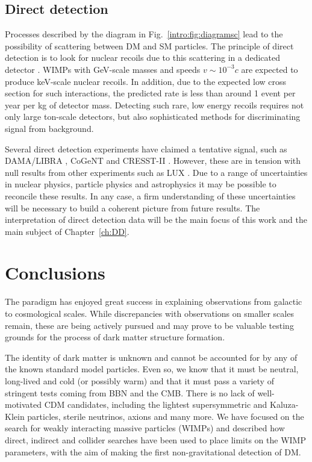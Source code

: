 
\subsection{Direct detection}

Processes described by the diagram in Fig.~\ref{intro:fig:diagramsc} lead to the possibility of scattering between DM and SM particles. The principle of direct detection is to look for nuclear recoils due to this scattering in a dedicated detector \cite{Goodman:1985,Drukier:1986}. WIMPs with GeV-scale masses and speeds $v \sim 10^{-3} c$ are expected to produce keV-scale nuclear recoils. In addition, due to the expected low cross section for such interactions, the predicted rate is less than around 1 event per year per kg of detector mass. Detecting such rare, low energy recoils requires not only large ton-scale detectors, but also sophisticated methods for discriminating signal from background.

Several direct detection experiments have claimed a tentative signal, such as DAMA/LIBRA \cite{Bernabei:2010}, CoGeNT \cite{Aalseth:2011a, Aalseth:2011b} and CRESST-II \cite{Stodolsky:2012}. However, these are in tension with null results from other experiments such as LUX \cite{Akerib:2014}. Due to a range of uncertainties in nuclear physics, particle physics and astrophysics it may be possible to reconcile these results. In any case, a firm understanding of these uncertainties will be necessary to build a coherent picture from future results. The interpretation of direct detection data will be the main focus of this work and the main subject of Chapter~\ref{ch:DD}.


\section{Conclusions}

The \LCDM paradigm has enjoyed great success in explaining observations from galactic to cosmological scales. While discrepancies with observations on smaller scales remain, these are being actively pursued and may prove to be valuable testing grounds for the process of dark matter structure formation.

The identity of dark matter is unknown and cannot be accounted for by any of the known standard model particles. Even so, we know that it must be neutral, long-lived and cold (or possibly warm) and that it must pass a variety of stringent tests coming from BBN and the CMB. There is no lack of well-motivated CDM candidates, including the lightest supersymmetric and Kaluza-Klein particles, sterile neutrinos, axions and many more. We have focused on the search for weakly interacting massive particles (WIMPs) and described how direct, indirect and collider searches have been used to place limits on the WIMP parameters, with the aim of making the first non-gravitational detection of DM.
